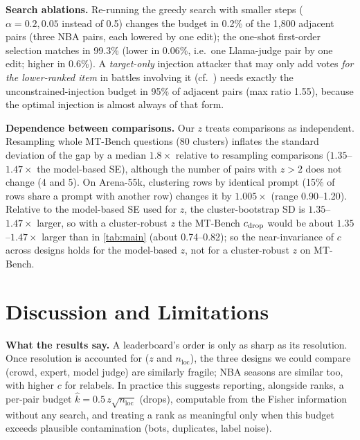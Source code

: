 \documentclass{article}
\theoremstyle{plain}
\theoremstyle{remark}
\newcommand{\nloc}{n_{\mathrm{loc}}}
\begin{document}
\textbf{Search ablations.} Re-running the greedy search with smaller steps ($\alpha=0.2,0.05$ instead of 0.5) changes the budget in 0.2\% of the 1,800 adjacent pairs (three NBA pairs, each lowered by one edit); the one-shot first-order selection matches in 99.3\% (lower in 0.06\%, i.e.\ one Llama-judge pair by one edit; higher in 0.6\%). A \emph{target-only} injection attacker that may only add votes \emph{for the lower-ranked item} in battles involving it (cf.\ \citealp{min2025}) needs exactly the unconstrained-injection budget in 95\% of adjacent pairs (max ratio 1.55), because the optimal injection is almost always of that form.

\textbf{Dependence between comparisons.} Our $z$ treats comparisons as independent. Resampling whole MT-Bench questions (80 clusters) inflates the standard deviation of the gap by a median $1.8\times$ relative to resampling comparisons ($1.35$--$1.47\times$ the model-based SE), although the number of pairs with $z>2$ does not change (4 and 5). On Arena-55k, clustering rows by identical prompt (15\% of rows share a prompt with another row) changes it by $1.005\times$ (range 0.90--1.20). Relative to the model-based SE used for $z$, the cluster-bootstrap SD is $1.35$--$1.47\times$ larger, so with a cluster-robust $z$ the MT-Bench $c_{\rm drop}$ would be about $1.35$--$1.47\times$ larger than in \cref{tab:main} (about 0.74--0.82); so the near-invariance of $c$ across designs holds for the model-based $z$, not for a cluster-robust $z$ on MT-Bench.

\section{Discussion and Limitations}
\textbf{What the results say.} A leaderboard's order is only as sharp as its resolution. Once resolution is accounted for ($z$ and $\nloc$), the three designs we could compare (crowd, expert, model judge) are similarly fragile; NBA seasons are similar too, with higher $c$ for relabels. In practice this suggests reporting, alongside ranks, a per-pair budget $\hat k=0.5\,z\sqrt{\nloc}$ (drops), computable from the Fisher information without any search, and treating a rank as meaningful only when this budget exceeds plausible contamination (bots, duplicates, label noise).
\end{document}
